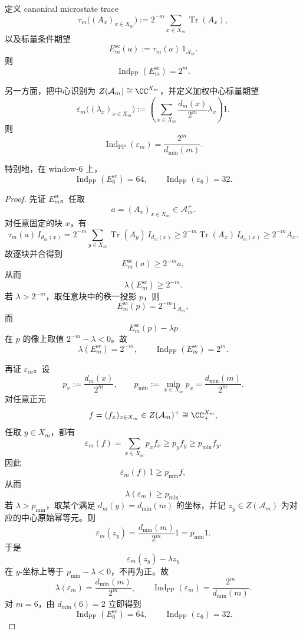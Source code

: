 \begin{theorem}[标量条件期望的全地址指数与加权中心指数]\label{thm:xi-time-part9ze-scalar-weighted-center-condexp-indices}
定义 canonical microstate trace
\[
\tau_m\bigl((A_x)_{x\in X_m}\bigr)
:=
2^{-m}\sum_{x\in X_m}\operatorname{Tr}(A_x),
\]
以及标量条件期望
\[
E_m^{\mathrm{sc}}(a):=\tau_m(a)\,1_{\mathcal A_m}.
\]
则
\[
\operatorname{Ind}_{\mathrm{PP}}(E_m^{\mathrm{sc}})=2^m.
\]

另一方面，把中心识别为 \(Z(\mathcal A_m)\cong \CC^{X_m}\)，并定义加权中心标量期望
\[
\varepsilon_m\bigl((\lambda_x)_{x\in X_m}\bigr)
:=
\left(
\sum_{x\in X_m}\frac{d_m(x)}{2^m}\lambda_x
\right)1.
\]
则
\[
\operatorname{Ind}_{\mathrm{PP}}(\varepsilon_m)=\frac{2^m}{d_{\min}(m)}.
\]

特别地，在 window-\(6\) 上，
\[
\operatorname{Ind}_{\mathrm{PP}}(E_6^{\mathrm{sc}})=64,
\qquad
\operatorname{Ind}_{\mathrm{PP}}(\varepsilon_6)=32.
\]
\end{theorem}
\begin{proof}
先证 \(E_m^{\mathrm{sc}}\)。任取
\[
a=(A_x)_{x\in X_m}\in \mathcal A_m^+.
\]
对任意固定的块 \(x\)，有
\[
\tau_m(a)\,I_{d_m(x)}
=
2^{-m}\sum_{y\in X_m}\operatorname{Tr}(A_y)\,I_{d_m(x)}
\ge
2^{-m}\operatorname{Tr}(A_x)\,I_{d_m(x)}
\ge
2^{-m}A_x.
\]
故逐块并合得到
\[
E_m^{\mathrm{sc}}(a)\ge 2^{-m}a,
\]
从而
\[
\lambda(E_m^{\mathrm{sc}})\ge 2^{-m}.
\]
若 \(\lambda>2^{-m}\)，取任意块中的秩一投影 \(p\)，则
\[
E_m^{\mathrm{sc}}(p)=2^{-m}1_{\mathcal A_m},
\]
而
\[
E_m^{\mathrm{sc}}(p)-\lambda p
\]
在 \(p\) 的像上取值 \(2^{-m}-\lambda<0\)。故
\[
\lambda(E_m^{\mathrm{sc}})=2^{-m},
\qquad
\operatorname{Ind}_{\mathrm{PP}}(E_m^{\mathrm{sc}})=2^m.
\]

再证 \(\varepsilon_m\)。设
\[
p_x:=\frac{d_m(x)}{2^m},
\qquad
p_{\min}:=\min_{x\in X_m}p_x=\frac{d_{\min}(m)}{2^m}.
\]
对任意正元
\[
f=(f_x)_{x\in X_m}\in Z(\mathcal A_m)^+\cong \CC_+^{X_m},
\]
任取 \(y\in X_m\)，都有
\[
\varepsilon_m(f)=\sum_{x\in X_m}p_x f_x\ge p_y f_y\ge p_{\min} f_y.
\]
因此
\[
\varepsilon_m(f)\,1\ge p_{\min} f,
\]
从而
\[
\lambda(\varepsilon_m)\ge p_{\min}.
\]
若 \(\lambda>p_{\min}\)，取某个满足 \(d_m(y)=d_{\min}(m)\) 的坐标，并记 \(z_y\in Z(\mathcal A_m)\) 为对应的中心原始幂等元。则
\[
\varepsilon_m(z_y)=\frac{d_{\min}(m)}{2^m}1=p_{\min}1.
\]
于是
\[
\varepsilon_m(z_y)-\lambda z_y
\]
在 \(y\)-坐标上等于 \(p_{\min}-\lambda<0\)，不再为正。故
\[
\lambda(\varepsilon_m)=\frac{d_{\min}(m)}{2^m},
\qquad
\operatorname{Ind}_{\mathrm{PP}}(\varepsilon_m)=\frac{2^m}{d_{\min}(m)}.
\]
对 \(m=6\)，由 \(d_{\min}(6)=2\) 立即得到
\[
\operatorname{Ind}_{\mathrm{PP}}(E_6^{\mathrm{sc}})=64,
\qquad
\operatorname{Ind}_{\mathrm{PP}}(\varepsilon_6)=32.
\]
\end{proof}

